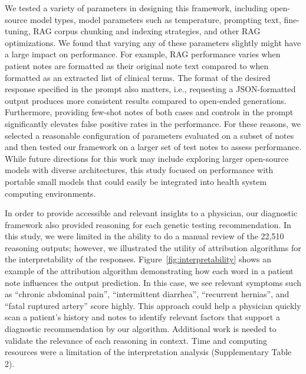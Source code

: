 \documentclass[fleqn,10pt]{wlscirep}
\begin{document}
We tested a variety of parameters in designing this framework, including open-source model types, model parameters such as temperature, prompting text, fine-tuning, RAG corpus chunking and indexing strategies, and other RAG optimizations. We found that varying any of these parameters slightly might have a large impact on performance. For example, RAG performance varies when patient notes are formatted as their original note text compared to when formatted as an extracted list of clinical terms. The format of the desired response specified in the prompt also matters, i.e., requesting a JSON-formatted output produces more consistent results compared to open-ended generations. Furthermore, providing few-shot notes of both cases and controls in the prompt significantly elevates false positive rates in the performance. For these reasons, we selected a reasonable configuration of parameters evaluated on a subset of notes and then tested our framework on a larger set of test notes to assess performance. While future directions for this work may include exploring larger open-source models with diverse architectures, this study focused on performance with portable small models that could easily be integrated into health system computing environments. 

In order to provide accessible and relevant insights to a physician, our diagnostic framework also provided reasoning for each genetic testing recommendation. In this study, we were limited in the ability to do a manual review of the 22,510 reasoning outputs; however, we illustrated the utility of attribution algorithms for the interpretability of the responses.  Figure~\ref{fig:interpretability} shows an example of the attribution algorithm demonstrating how each word in a patient note influences the output prediction. In this case, we see relevant symptoms such as ``chronic abdominal pain'', ``intermittent diarrhea'', ``recurrent hernias'', and ``fatal ruptured artery'' score highly. This approach could help a physician quickly scan a patient’s history and notes to identify relevant factors that support a diagnostic recommendation by our algorithm.  Additional work is needed to validate the relevance of each reasoning in context. Time and computing resources were a limitation of the interpretation analysis (Supplementary Table 2).
\end{document}
